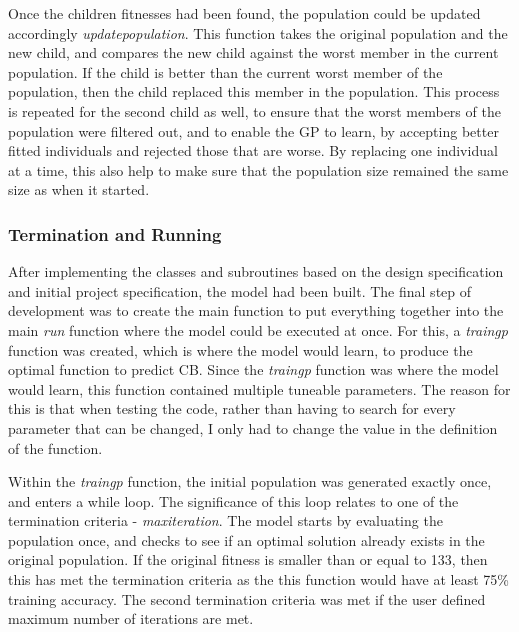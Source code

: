 \documentclass[11pt]{article}
\begin{document}
Once the children fitnesses had been found, the population could be updated accordingly \textit{update\textunderscore population}. This function takes the original population and the new child, and compares the new child against the worst member in the current population. If the child is better than the current worst member of the population, then the child replaced this member in the population. This process is repeated for the second child as well, to ensure that the worst members of the population were filtered out, and to enable the GP to learn, by accepting better fitted individuals and rejected those that are worse. By replacing one individual at a time, this also help to make sure that the population size remained the same size as when it started. 
\subsubsection{Termination and Running}
After implementing the classes and subroutines based on the design specification and initial project specification, the model had been built. The final step of development was to create the main function to put everything together into the main \textit{run} function where the model could be executed at once. For this, a \textit{train\textunderscore gp} function was created, which is where the model would learn, to produce the optimal function to predict CB. Since the \textit{train\textunderscore gp} function was where the model would learn, this function contained multiple tuneable parameters. The reason for this is that when testing the code, rather than having to search for every parameter that can be changed, I only had to change the value in the definition of the function.

Within the \textit{train\textunderscore gp} function, the initial population was generated exactly once, and enters a while loop. The significance of this loop relates to one of the termination criteria - \textit{max\textunderscore iteration}. The model starts by evaluating the population once, and checks to see if an optimal solution already exists in the original population. If the original fitness is smaller than or equal to 133, then this has met the termination criteria as the this function would have at least 75\% training accuracy. The second termination criteria was met if the user defined maximum number of iterations are met. 
\end{document}
